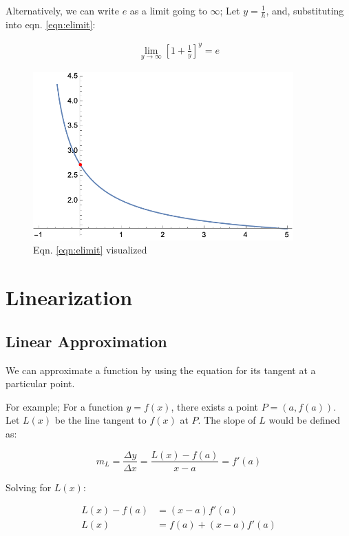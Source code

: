 \documentclass[12pt]{article}
\begin{document}
Alternatively, we can write $e$ as a limit going to $\infty$; Let $y = \frac{1}{h}$, and, substituting into eqn. \ref{eqn:elimit}:

\begin{equation}
    \begin{split}
        \lim_{y\to\infty}[1+\frac{1}{y}]^y = e
    \end{split}
\end{equation}

\begin{figure}
    \centering
    \includegraphics[width=10.0cm]{misc/easalimit.png}
    \caption{Eqn. \ref{eqn:elimit} visualized}
\end{figure}

\section{Linearization}\label{sec:linearization}
\subsection{Linear Approximation}
We can approximate a function by using the equation for its tangent at a particular point.

For example; For a function $y=f(x)$, there exists a point $P = (a, f(a))$. Let $L(x)$ be the line tangent to $f(x)$ at $P$. The slope of $L$ would be defined as:

$$m_L = \frac{\Delta y}{\Delta x} = \frac{L(x) - f(a)}{x - a} = f'(a)$$

Solving for $L(x)$:

\begin{equation}
    \begin{split}
        L(x) - f(a) &= (x-a)f'(a)\\
        L(x) &= f(a) + (x-a)f'(a)\\
    \end{split}
\end{equation}
\end{document}
